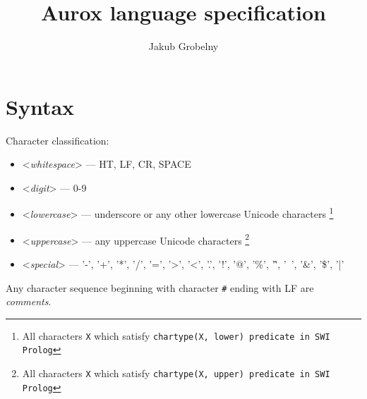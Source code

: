 \documentclass[12pt]{article}
\title{\huge
    \textbf{Aurox language specification}}
\author{\Large Jakub Grobelny}
\begin{document}
\maketitle

\section{Syntax}

Character classification:
\begin{itemize}
    \item <\textit{whitespace}> --- HT, LF, CR, SPACE
    \item <\textit{digit}> --- 0-9
    \item <\textit{lowercase}> --- underscore or any other lowercase Unicode 
        characters \footnote{
            All characters \texttt{X} which satisfy 
            \texttt{char\textunderscore type(X, lower) predicate in SWI Prolog}
            }
    \item <\textit{uppercase}> --- any uppercase Unicode characters \footnote{
        All characters \texttt{X} which satisfy
        \texttt{char\textunderscore type(X, upper) predicate in SWI Prolog}
        }
    \item <\textit{special}> --- '-', '+', '*', '/', '=', '>', '<', '.', '!', '@', '\%', '\^', '~', '\&', '\$', '|'
\end{itemize}

Any character sequence beginning with character \texttt{\#} ending with LF are 
\textit{comments}.
\end{document}
